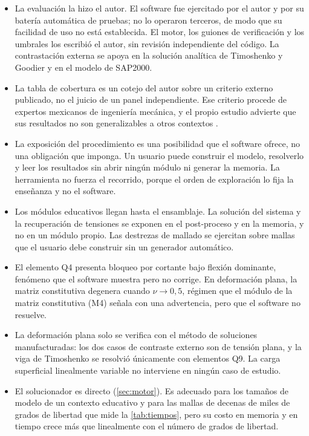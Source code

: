 \begin{itemize}
    \item La evaluación la hizo el autor. El software fue ejercitado por el autor y por su batería automática de pruebas; no lo operaron terceros, de modo que su facilidad de uso no está establecida. El motor, los guiones de verificación y los umbrales los escribió el autor, sin revisión independiente del código. La contrastación externa se apoya en la solución analítica de Timoshenko y Goodier y en el modelo de SAP2000.
    \item La tabla de cobertura es un cotejo del autor sobre un criterio externo publicado, no el juicio de un panel independiente. Ese criterio procede de expertos mexicanos de ingeniería mecánica, y el propio estudio advierte que sus resultados no son generalizables a otros contextos \autocite[p.~1171]{perezsantiago2023fem}.
    \item La exposición del procedimiento es una posibilidad que el software ofrece, no una obligación que imponga. Un usuario puede construir el modelo, resolverlo y leer los resultados sin abrir ningún módulo ni generar la memoria. La herramienta no fuerza el recorrido, porque el orden de exploración lo fija la enseñanza y no el software.
    \item Los módulos educativos llegan hasta el ensamblaje. La solución del sistema y la recuperación de tensiones se exponen en el post-proceso y en la memoria, y no en un módulo propio. Las destrezas de mallado se ejercitan sobre mallas que el usuario debe construir sin un generador automático.
    \item El elemento Q4 presenta bloqueo por cortante bajo flexión dominante, fenómeno que el software muestra pero no corrige. En deformación plana, la matriz constitutiva degenera cuando $\nu \to 0{,}5$, régimen que el módulo de la matriz constitutiva (M4) señala con una advertencia, pero que el software no resuelve.
    \item La deformación plana solo se verifica con el método de soluciones manufacturadas: los dos casos de contraste externo son de tensión plana, y la viga de Timoshenko se resolvió únicamente con elementos Q9. La carga superficial linealmente variable no interviene en ningún caso de estudio.
    \item El solucionador es directo (\autoref{sec:motor}). Es adecuado para los tamaños de modelo de un contexto educativo y para las mallas de decenas de miles de grados de libertad que mide la \autoref{tab:tiempos}, pero su costo en memoria y en tiempo crece más que linealmente con el número de grados de libertad.
\end{itemize}

